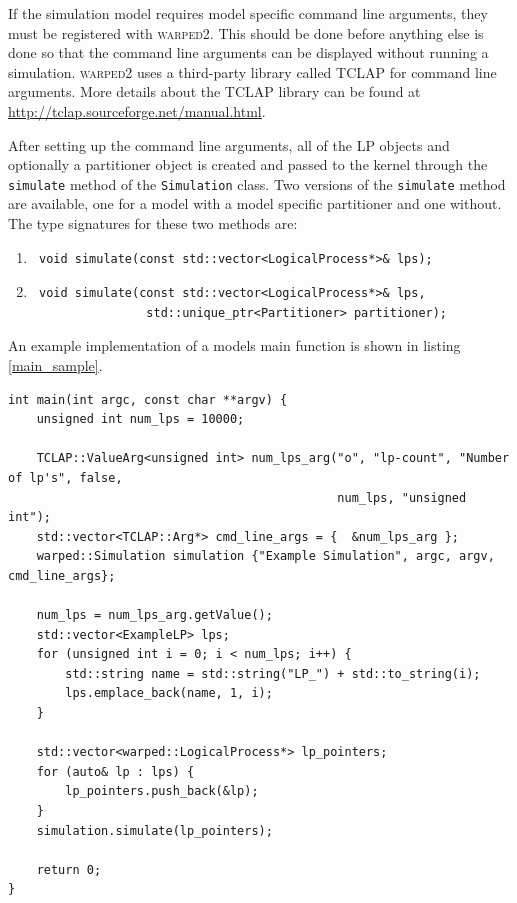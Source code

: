 \documentclass[11pt]{book}
\begin{document}
If the simulation model requires model specific command line arguments, they must be registered with
\textsc{warped2}.  This should be done before anything else is done so that the command line
arguments can be displayed without running a simulation.  \textsc{warped2} uses a third-party
library called TCLAP for command line arguments.  More details about the TCLAP library can be found
at \url{http://tclap.sourceforge.net/manual.html}.

After setting up the command line arguments, all of the LP objects and optionally a partitioner
object is created and passed to the kernel through the \texttt{simulate} method of the
\texttt{Simulation} class.  Two versions of the \texttt{simulate} method are available, one for a
model with a model specific partitioner and one without.  The type signatures for these two methods
are:

\begin{enumerate}
    \item \begin{verbatim} void simulate(const std::vector<LogicalProcess*>& lps); \end{verbatim}
    \item \begin{verbatim} void simulate(const std::vector<LogicalProcess*>& lps,
                std::unique_ptr<Partitioner> partitioner); \end{verbatim}
\end{enumerate}

\noindent
An example implementation of a models main function is shown in listing \ref{main_sample}.

\begin{lstlisting}[caption=Exmple \textsc{warped2} Main Definition, label=main_sample, float]
int main(int argc, const char **argv) {
    unsigned int num_lps = 10000;

    TCLAP::ValueArg<unsigned int> num_lps_arg("o", "lp-count", "Number of lp's", false,
                                              num_lps, "unsigned int");
    std::vector<TCLAP::Arg*> cmd_line_args = {  &num_lps_arg };
    warped::Simulation simulation {"Example Simulation", argc, argv, cmd_line_args};

    num_lps = num_lps_arg.getValue();
    std::vector<ExampleLP> lps;
    for (unsigned int i = 0; i < num_lps; i++) {
        std::string name = std::string("LP_") + std::to_string(i);
        lps.emplace_back(name, 1, i);
    }

    std::vector<warped::LogicalProcess*> lp_pointers;
    for (auto& lp : lps) {
        lp_pointers.push_back(&lp);
    }
    simulation.simulate(lp_pointers);

    return 0;
}
\end{lstlisting}
\end{document}
